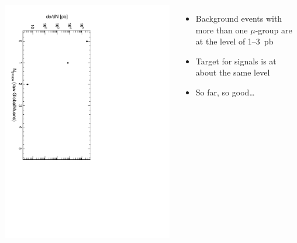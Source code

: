 \documentclass[compress]{beamer}
\begin{document}
\begin{frame}
\begin{columns}
\includegraphics[height=\linewidth, angle=90]{groups_PlainGlobalMuonAny.pdf}

\begin{itemize}
\item Background events with more than one $\mu$-group are at the level of 1--3~pb
\item Target for signals is at about the same level
\item So far, so good\ldots
\end{itemize}
\end{columns}
\end{frame}
\end{document}
